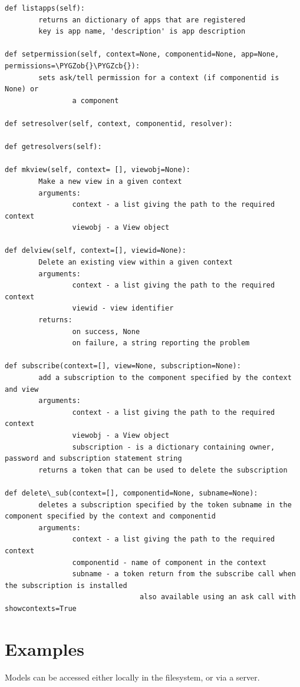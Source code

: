 \documentclass[a4paper,10pt,english]{sphinxmanual}
\def\PYGZob{\char`\{}
\def\PYGZcb{\char`\}}
\begin{document}
\begin{Verbatim}[commandchars=\\\{\}]
def listapps(self):
        returns an dictionary of apps that are registered
        key is app name, 'description' is app description

def setpermission(self, context=None, componentid=None, app=None, permissions=\PYGZob{}\PYGZcb{}):
        sets ask/tell permission for a context (if componentid is None) or
                a component

def setresolver(self, context, componentid, resolver):

def getresolvers(self):

def mkview(self, context= [], viewobj=None):
        Make a new view in a given context
        arguments:
                context - a list giving the path to the required context
                viewobj - a View object

def delview(self, context=[], viewid=None):
        Delete an existing view within a given context
        arguments:
                context - a list giving the path to the required context
                viewid - view identifier
        returns:
                on success, None
                on failure, a string reporting the problem

def subscribe(context=[], view=None, subscription=None):
        add a subscription to the component specified by the context and view
        arguments:
                context - a list giving the path to the required context
                viewobj - a View object
                subscription - is a dictionary containing owner, password and subscription statement string
        returns a token that can be used to delete the subscription

def delete\_sub(context=[], componentid=None, subname=None):
        deletes a subscription specified by the token subname in the component specified by the context and componentid
        arguments:
                context - a list giving the path to the required context
                componentid - name of component in the context
                subname - a token return from the subscribe call when the subscription is installed
                                also available using an ask call with showcontexts=True
\end{Verbatim}


\section{Examples}
\label{API:examples}
Models can be accessed either locally in the filesystem, or via a server.
\end{document}
